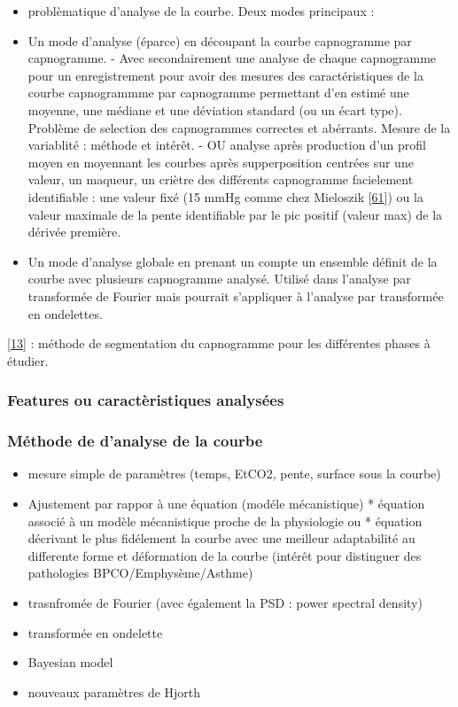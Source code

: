 \documentclass[12pt,]{article}
\providecommand{\tightlist}{%
  \setlength{\itemsep}{0pt}\setlength{\parskip}{0pt}}
\begin{document}
\begin{itemize}
\item
  problèmatique d'analyse de la courbe. Deux modes principaux :
\item
  Un mode d'analyse (éparce) en découpant la courbe capnogramme par
  capnogramme. - Avec secondairement une analyse de chaque capnogramme
  pour un enregistrement pour avoir des mesures des caractéristiques de
  la courbe capnogrammme par capnogramme permettant d'en estimé une
  moyenne, une médiane et une déviation standard (ou un écart type).
  Problème de selection des capnogrammes correctes et abérrants. Mesure
  de la variablité : méthode et intérêt. - OU analyse après production
  d'un profil moyen en moyennant les courbes après supperposition
  centrées sur une valeur, un maqueur, un criètre des différents
  capnogramme facielement identifiable : une valeur fixé (15 mmHg comme
  chez Mieloszik
  {[}\protect\hyperlink{ref-mieloszyk2014automated}{61}{]}) ou la valeur
  maximale de la pente identifiable par le pic positif (valeur max) de
  la dérivée première.
\item
  Un mode d'analyse globale en prenant un compte un ensemble définit de
  la courbe avec plusieurs capnogramme analysé. Utilisé dans l'analyse
  par transformée de Fourier mais pourrait s'appliquer à l'analyse par
  transformée en ondelettes.
\end{itemize}

{[}\protect\hyperlink{ref-roy2007calculating}{13}{]} : méthode de
segmentation du capnogramme pour les différentes phases à étudier.

\hypertarget{features-ou-caractuxe8ristiques-analysuxe9es}{%
\subsubsection{Features ou caractèristiques
analysées}\label{features-ou-caractuxe8ristiques-analysuxe9es}}

\hypertarget{muxe9thode-de-danalyse-de-la-courbe}{%
\subsubsection{Méthode de d'analyse de la
courbe}\label{muxe9thode-de-danalyse-de-la-courbe}}

\begin{itemize}
\tightlist
\item
  mesure simple de paramètres (temps, EtCO2, pente, surface sous la
  courbe)
\item
  Ajustement par rappor à une équation (modéle mécanistique) * équation
  associé à un modèle mécanistique proche de la physiologie ou *
  équation décrivant le plus fidélement la courbe avec une meilleur
  adaptabilité au differente forme et déformation de la courbe (intérêt
  pour distinguer des pathologies BPCO/Emphysème/Asthme)
\item
  trasnfromée de Fourier (avec également la PSD : power spectral
  density)
\item
  transformée en ondelette
\item
  Bayesian model
\item
  nouveaux paramètres de Hjorth
\end{itemize}
\end{document}
